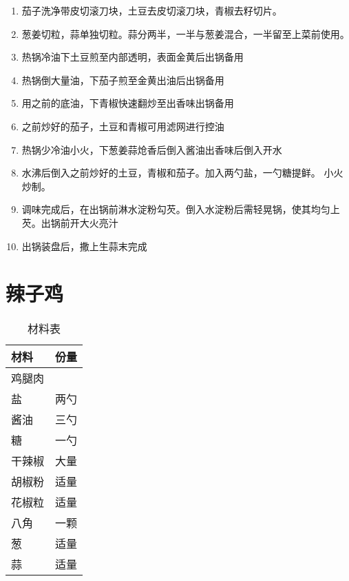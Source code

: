 \begin{enumerate}
    \item 茄子洗净带皮切滚刀块，土豆去皮切滚刀块，青椒去籽切片。
    \item 葱姜切粒，蒜单独切粒。蒜分两半，一半与葱姜混合，一半留至上菜前使用。
    \item 热锅冷油下土豆煎至内部透明，表面金黄后出锅备用
    \item 热锅倒大量油，下茄子煎至金黄出油后出锅备用
    \item 用之前的底油，下青椒快速翻炒至出香味出锅备用
    \item 之前炒好的茄子，土豆和青椒可用滤网进行控油
    \item 热锅少冷油小火，下葱姜蒜炝香后倒入酱油出香味后倒入开水
    \item 水沸后倒入之前炒好的土豆，青椒和茄子。加入两勺盐，一勺糖提鲜。 小火炒制。
    \item 调味完成后，在出锅前淋水淀粉勾芡。倒入水淀粉后需轻晃锅，使其均匀上芡。出锅前开大火亮汁
    \item 出锅装盘后，撒上生蒜末完成
\end{enumerate}


\section{辣子鸡}

\begin{table}[H]
    \centering
    \begin{tabular}{|l||c|}\hline
     \textbf{材料}    &  \textbf{份量}\\ \hline\hline
    鸡腿肉   &   \\ \hline
    盐    & 两勺  \\ \hline
    酱油    & 三勺 \\ \hline
    糖 & 一勺\\ \hline 
    干辣椒 & 大量\\ \hline 
    胡椒粉 & 适量 \\ \hline
    花椒粒 & 适量\\ \hline 
    八角 &  一颗\\ \hline 
    葱 & 适量\\ \hline 
    蒜 & 适量\\ \hline 
    \end{tabular}
    \caption{材料表}
\end{table}

